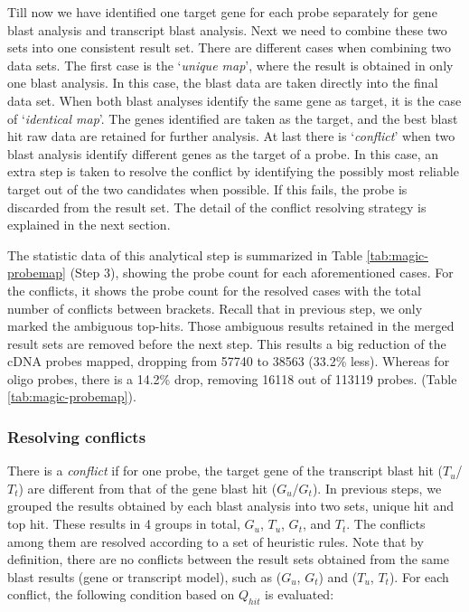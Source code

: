 Till now we have identified one target gene for each probe separately for gene 
blast analysis and transcript blast analysis. 
Next we need to combine these two sets into one consistent result set. 
%
There are different cases when combining two data sets. 
The first case is the `\textit{unique map}', where the result is obtained in 
only one blast analysis. In this case, the blast data are taken directly into 
the final data set.
%
When both blast analyses identify the same gene as target, it is the case of 
`\textit{identical map}'. The genes identified are taken as the target, and the 
best blast hit raw data are retained for further analysis.
%
At last there is `\textit{conflict}' when two blast analysis identify 
different genes as the target of a probe.  
In this case, an extra step is taken to resolve the conflict by identifying the 
possibly most reliable target out of the two candidates when possible. If this fails, 
the probe is discarded from the result set.
The detail of the conflict resolving strategy is explained in the next section.

The statistic data of this analytical step is summarized in Table 
\ref{tab:magic-probemap} (Step 3), showing the probe count for each 
aforementioned cases.
For the conflicts, it shows the probe count for the resolved cases with 
the total number of conflicts between brackets.
%
Recall that in previous step, we only marked the ambiguous top-hits. Those 
ambiguous results retained in the merged result sets are removed before the 
next step.
This results a big reduction of the cDNA probes mapped, dropping from 57740 to 
38563 (33.2\% less). Whereas for oligo probes, there is a 14.2\% drop, 
removing 16118 out of 113119 probes. (Table \ref{tab:magic-probemap}).


\subsubsection{Resolving conflicts}\label{apd:magic-conflict}

There is a \textit{conflict} if for one probe, the target gene of the 
transcript blast hit ($T_u$/$T_t$) are different from that of the gene blast 
hit ($G_u$/$G_t$). 
In previous steps, we grouped the results obtained by each blast analysis into 
two sets, unique hit and top hit. These results in 4 groups in total, $G_u$, 
$T_u$, $G_t$, and $T_t$.
The conflicts among them are resolved according to a set of heuristic rules. 
Note that by definition, there are no conflicts between the result sets 
obtained from the same blast results (gene or transcript model), such as 
($G_u$, $G_t$) and ($T_u$, $T_t$). 
For each conflict, the following condition based on $Q_{hit}$ is evaluated: 

